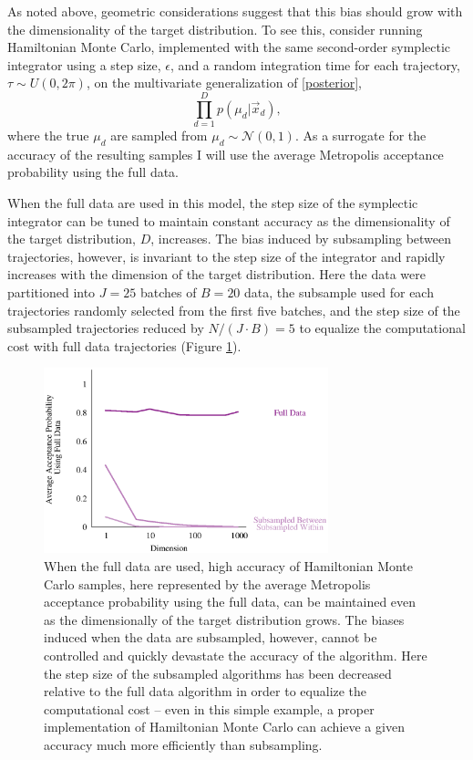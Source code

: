 \documentclass{article}
\begin{document}
As noted above, geometric considerations suggest that this bias should grow with the 
dimensionality of the target distribution.  To see this, consider running Hamiltonian
Monte Carlo, implemented with the same second-order symplectic integrator using
a step size, $\epsilon$, and a random integration time for each trajectory, 
$\tau \sim U \! \left(0, 2 \pi \right)$, on the multivariate generalization of \eqref{posterior},
%
\begin{equation} \label{multivariate_posterior}
\prod_{d = 1}^{D} p \! \left( \mu_{d} | \vec{x}_{d} \right),
\end{equation}
%
where the true $\mu_{d}$ are sampled from $\mu_{d} \sim \mathcal{N} \! \left( 0, 1 \right)$.
As a surrogate for the accuracy of the resulting samples I will use the average
Metropolis acceptance probability using the full data.

When the full data are used in this model, the step size of the symplectic integrator can be 
tuned to maintain constant accuracy as the dimensionality of the target distribution, $D$, increases.
The bias induced by subsampling between trajectories, however, is invariant to the
step size of the integrator and rapidly increases with the dimension of the target distribution.
Here the data were partitioned into $J = 25$ batches of $B = 20$ data, the subsample
used for each trajectories randomly selected from the first five batches, and the step size 
of the subsampled trajectories reduced by $N / (J \cdot B) = 5$ to equalize the computational
cost with full data trajectories (Figure \ref{fig:multivariate}).

\begin{figure}
\centering
\includegraphics[width=3.25in]{multivariate.eps}
\caption{When the full data are used, high accuracy of Hamiltonian Monte Carlo samples, 
here represented by the average Metropolis acceptance probability using the full data, can 
be maintained even as the dimensionally of the target distribution grows.  The biases induced 
when the data are subsampled, however, cannot be controlled and quickly devastate the 
accuracy of the algorithm.  Here the step size of the subsampled algorithms has been decreased
relative to the full data algorithm in order to equalize the computational cost -- even in this
simple example, a proper implementation of Hamiltonian Monte Carlo can achieve a given
accuracy much more efficiently than subsampling.}
\label{fig:multivariate}
\end{figure}
\end{document}
